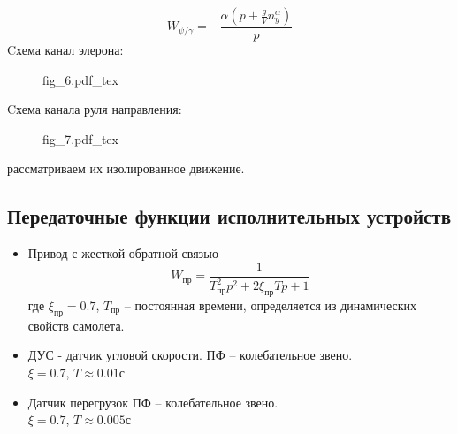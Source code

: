 \documentclass{article}
\begin{document}
\[
W_{\psi/\gamma} = -\frac{\alpha(p + \frac{g}{V} n_y^\alpha)} {p}
\]
Cхема канал элерона:
\begin{figure}[ht]
\centering
{fig_6.pdf_tex}
\end{figure}
Cхема канала руля направления:
\begin{figure}[ht]
    \centering
{fig_7.pdf_tex}
\end{figure}
рассматриваем их изолированное движение.

\subsection{Передаточные функции исполнительных устройств}
\begin{itemize}
\item Привод с жесткой обратной связью
\[
W_{пр} = \frac{1}{T_{пр}^2p^2 + 2 \xi_{пр} Tp + 1}
\]
где $\xi_{пр} = 0.7$, $T_{пр}$ -- постоянная времени, определяется из динамических свойств самолета.

\item ДУС - датчик угловой скорости.
ПФ -- колебательное звено.\\
$\xi = 0.7$, $T \approx 0.01 с$

\item Датчик перегрузок 
ПФ -- колебательное звено.\\
$\xi = 0.7$, $T \approx 0.005 с$
\end{itemize}
\end{document}
